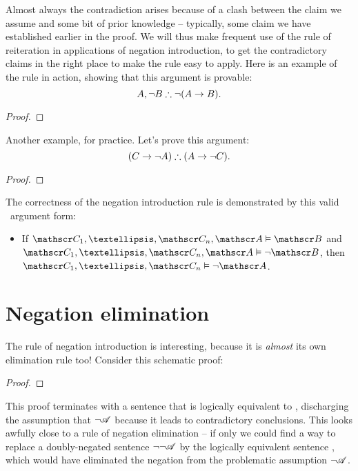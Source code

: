Almost always the contradiction arises because of a clash between the claim we assume and some bit of prior knowledge – typically, some claim we have established earlier in the proof. We will thus make frequent use of the rule of reiteration in applications of negation introduction, to get the contradictory claims in the right place to make the rule easy to apply. Here is an example of the rule in action, showing that this argument is provable: $$A, \neg B \mathrel{\therefore} \neg (A \rightarrow B).$$ \begin{proof}
	\open
	\close
\end{proof}

Another example, for practice. Let's prove this argument: $$(C \rightarrow \neg A) \therefore (A \rightarrow \neg C).$$ \begin{proof}
	\open
	\open
	\close
	\close
\end{proof}


The correctness of the negation introduction rule is demonstrated by this valid \TFL\ argument form: \begin{itemize}
	\item If $\meta{C}_{1},…,\meta{C}_{n},\meta{A} \vDash \meta{B}$ and $\meta{C}_{1},…,\meta{C}_{n},\meta{A} \vDash \enot\meta{B}$, then $\meta{C}_{1},…,\meta{C}_{n} \vDash \enot\meta{A}$. \end{itemize}

\section{Negation elimination}\label{negelim}

The rule of negation introduction is interesting, because it is \emph{almost} its own elimination rule too! Consider this schematic proof: \begin{proof}
	\open 
	\have[\ ]{}{\vdots}
	\have[\ ]{}{\vdots}
	\close
\end{proof} This proof terminates with a sentence that is logically equivalent to , discharging the assumption that $\neg\mathscr{A}$ because it leads to contradictory conclusions. This looks awfully close to a rule of negation elimination – if only we could find a way to replace a doubly-negated sentence $\neg\neg\mathscr{A}$ by the logically equivalent sentence , which would have eliminated the negation from the problematic assumption $\neg\mathscr{A}$.



